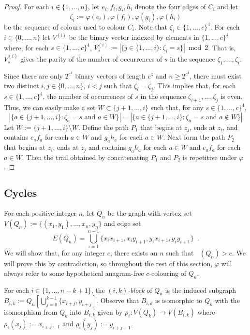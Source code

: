 \documentclass[kpfonts]{patmorin}
\DeclareMathOperator{\ci}{\overline{\pi}}
\begin{document}
\begin{proof}
    For each $i\in\{1,\ldots,n\}$, let $e_i,f_i,g_i,h_i$ denote the four edges of $C_i$ and let
    \[
        \zeta_i:=\varphi(e_i),\varphi(f_i),\varphi(g_i),\varphi(h_i)
    \]
     be the sequence of colours used to colour $C_i$.  Note that $\zeta_i\in\{1,\ldots,c\}^4$.  For each $i\in\{0,\ldots,n\}$ let $V^{(i)}$ be the binary vector indexed by elements in $\{1,\ldots,c\}^4$ where, for each $s\in\{1,\ldots,c\}^4$, $V^{(i)}_s:=|\{j\in\{1,\ldots,i\}:\zeta_i=s\}|\bmod 2$.  That is, $V^{(i)}_s$ gives the parity of the number of occurrences of $s$ in the sequence $\zeta_1,\ldots,\zeta_i$.

     Since there are only $2^{c^4}$ binary vectors of length $c^4$ and $n\ge 2^{c^4}$, there must exist two distinct $i,j\in\{0,\ldots,n\}$, $i<j$ such that $\zeta_i=\zeta_j$.  This implies that, for each $s\in\{1,\ldots,c\}^4$, the number of occurrences of $s$ in the sequence $\zeta_{i+1},\ldots,\zeta_j$ is even.  Thus, we can easily make a set $W\subset\{j+1,\ldots,i\}$ such that, for any $s\in\{1,\ldots,c\}^4$,
     \[
        |\{a\in\{j+1,\ldots,i\}: \mbox{$\zeta_a=s$ and $a\in W$}\}| =
        |\{a\in\{j+1,\ldots,i\}: \mbox{$\zeta_a=s$ and $a\not\in W$}\}|
     \]
     Let $\overline{W}:=\{j+1,\ldots,i\}\setminus W$.
     Define the path $P_1$ that begins at $z_j$, ends at $z_i$, and contains $e_af_a$ for each $a\in W$ and $g_ah_a$ for each $a\in\overline{W}$.  Next form the path $P_2$ that begins at $z_i$, ends at $z_j$ and contains $g_ah_a$ for each $a\in W$ and $e_af_a$ for each $a\in\overline{W}$.  Then the trail obtained by concatenating $P_1$ and $P_2$ is repetitive under $\varphi$.
\end{proof}

\subsection{Cycles}

For each positive integer $n$, let $Q_n$ be the graph with vertex set $V(Q_n):=\{(x_1,y_1),\ldots,x_n,y_n\}$ and edge set
\[
    E(Q_n) = \bigcup_{i=1}^{n-1} \{x_ix_{i+1}, x_iy_{i+1}, y_{i}x_{i+1}, y_{i}y_{i+1}\} \enspace .
\]
We will show that, for any integer $c$, there exists an $n$ such that $\ci(Q_n)>c$.  We will prove this by contradiction, so throughout the rest of this section, $\varphi$ will always refer to some hypothetical anagram-free $c$-colouring of $Q_n$.

For each $i\in\{1,\ldots,n-k+1\}$, the \emph{$(i,k)$-block} of $Q_n$ is the induced subgraph $B_{i,k}:=Q_n[\bigcup_{j=0}^{k-1}\{x_{i+j},y_{i+j}]$. Observe that $B_{i,k}$ is isomorphic to $Q_k$ with the isomorphism from $Q_k$ into $B_{i,k}$ given by $\rho_{i}:V(Q_k)\to V(B_{i,k})$ where $\rho_{i}(x_{j}):= x_{i+j-1}$ and $\rho_i(y_j):= y_{i+j-1}$.
\end{document}
